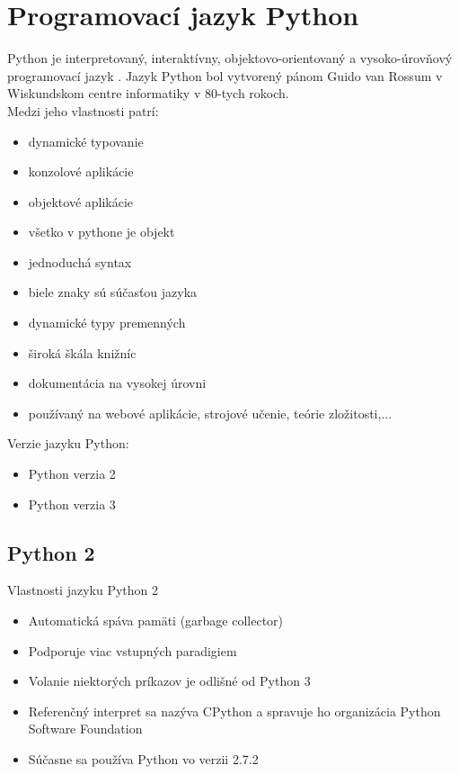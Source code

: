 \chapter{Programovací jazyk Python}
Python je interpretovaný, interaktívny, objektovo-orientovaný a vysoko-úrovňový programovací jazyk \cite{about}. Jazyk Python bol vytvorený pánom  Guido van Rossum v Wiskundskom centre informatiky v 80-tych rokoch. \\
Medzi jeho vlastnosti patrí:\begin{itemize}
\item dynamické typovanie
\item konzolové aplikácie
\item objektové aplikácie
\item všetko v pythone je objekt
\item jednoduchá syntax
\item biele znaky sú súčasťou jazyka
\item dynamické typy premenných
\item široká škála knižníc
\item dokumentácia na vysokej úrovni\
\item používaný  na webové aplikácie, strojové učenie, teórie zložitosti,...
\end{itemize}
Verzie jazyku Python:\begin{itemize}
\item Python verzia 2
\item Python verzia 3
\end{itemize}
\section{Python 2}
Vlastnosti jazyku Python 2\cite{Python2}
\begin{itemize}
\item Automatická spáva pamäti (garbage collector)
\item Podporuje viac vstupných paradigiem
\item Volanie niektorých príkazov je odlišné od Python 3
\item Referenčný interpret sa nazýva CPython a spravuje ho organizácia Python Software Foundation
\item Súčasne sa používa Python vo verzii 2.7.2
\end{itemize}
